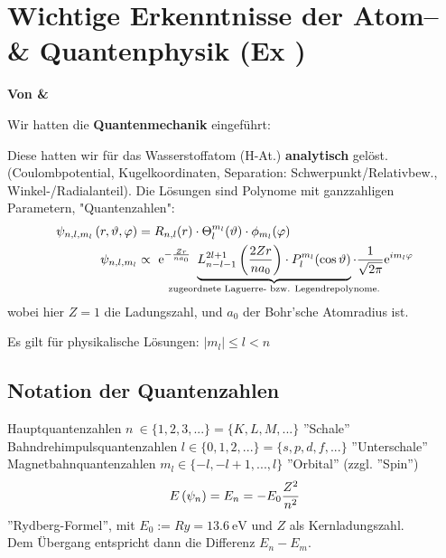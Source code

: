 \documentclass[Ex4_Zusammenfassung.tex]{subfiles}
\begin{document}
\chapter{Wichtige Erkenntnisse der Atom-- \& Quantenphysik (Ex )}
\textbf{Von \michi \& \paul} \newline

Wir hatten die \textbf{Quantenmechanik} eingeführt:


Diese hatten wir für das Wasserstoffatom (H-At.) \textbf{analytisch} gelöst. (Coulombpotential, Kugelkoordinaten, Separation: Schwerpunkt/Relativbew., Winkel-/Radialanteil). Die Lösungen sind Polynome mit ganzzahligen Parametern, "Quantenzahlen":
\begin{align*}
	\psi_{n,l,m_l}\lp r, \vartheta, \varphi \rp &= R_{n,l} (r) \cdot \Theta_l^{m_l} (\vartheta) \cdot \phi_{m_l} (\varphi)\\
	\psi_{n,l,m_l} &\propto\  \mathrm{e}^{- \frac{Zr}{na_0}}\  \underbrace{L_{n-l-1}^{2l+1} \lp \frac{2Zr}{na_0} \rp \cdot P_l^{m_l} (\cos{\vartheta})}_{\mathclap{\text{zugeordnete Laguerre- bzw. Legendrepolynome.}}} \cdot \frac{1}{\sqrt{2\pi}} \mathrm{e}^{im_l \varphi}
\end{align*}
wobei hier $Z=1$ die Ladungszahl, und $a_0$ der Bohr'sche Atomradius ist. 

Es gilt für physikalische Lösungen: $\boxed{ | m_l | \leq l < n } $

\section{Notation der Quantenzahlen}
Hauptquantenzahlen $n\ \in \{ 1, 2, 3, ... \} = \{K, L, M, ...\}$ ''Schale'' \\
Bahndrehimpulsquantenzahlen $ l \in \{0, 1, 2, ...\} = \{s, p, d, f, ...\} $ ''Unterschale'' \\
Magnetbahnquantenzahlen $m_l \in \{-l, -l+1, ... , l \}$ ''Orbital'' (zzgl. ''Spin'')\\
\begin{equation*}
	E \left( \psi_n \right) = E_n = -E_0 \frac{Z^2}{n^2}
\end{equation*}
''Rydberg-Formel'', mit $E_0 := Ry =\SI{13.6}{\eV} $ und $Z$ als Kernladungszahl.\\
Dem Übergang entspricht dann die Differenz $E_n - E_m$.
\end{document}
